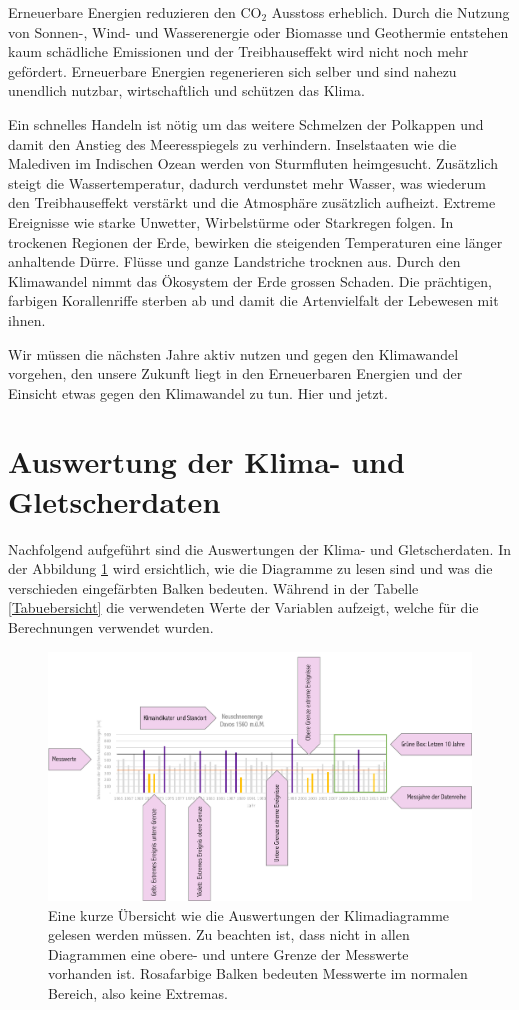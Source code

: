 \begin{refsection}
Erneuerbare Energien reduzieren den CO$_2$ Ausstoss erheblich. Durch die Nutzung von Sonnen-, Wind- und Wasserenergie oder Biomasse und Geothermie entstehen kaum schädliche Emissionen und der Treibhauseffekt wird nicht noch mehr gefördert. Erneuerbare Energien regenerieren sich selber und sind nahezu unendlich nutzbar, wirtschaftlich und schützen das Klima.

Ein schnelles Handeln ist nötig um das weitere Schmelzen der Polkappen und damit den Anstieg des Meeresspiegels zu verhindern. Inselstaaten wie die Malediven im Indischen Ozean werden von Sturmfluten heimgesucht. Zusätzlich steigt die Wassertemperatur, dadurch verdunstet mehr Wasser, was wiederum den Treibhauseffekt verstärkt und die Atmosphäre zusätzlich aufheizt. Extreme Ereignisse wie starke Unwetter, Wirbelstürme oder Starkregen folgen. In trockenen Regionen der Erde, bewirken die steigenden Temperaturen eine länger anhaltende Dürre. Flüsse und ganze Landstriche trocknen aus.
Durch den Klimawandel nimmt das Ökosystem der Erde grossen Schaden. Die prächtigen, farbigen Korallenriffe sterben ab und damit die Artenvielfalt der Lebewesen mit ihnen.


Wir müssen die nächsten Jahre aktiv nutzen und gegen den Klimawandel vorgehen, den unsere Zukunft liegt in den Erneuerbaren Energien und der Einsicht etwas gegen den Klimawandel zu tun. Hier und jetzt.

\section{Auswertung der Klima- und Gletscherdaten} \label{AuswertungKG}
Nachfolgend aufgeführt sind die Auswertungen der Klima- und Gletscherdaten. In der Abbildung \ref{KlimaDia} wird ersichtlich, wie die Diagramme zu lesen sind und was die verschieden eingefärbten Balken bedeuten. Während in der Tabelle \ref{Tabuebersicht} die verwendeten Werte der Variablen aufzeigt, welche für die Berechnungen verwendet wurden.

\begin{figure}
\centering
\includegraphics[width=1.0\textwidth]{extrem/Klimadiagrammlesen.pdf}
\caption{Eine kurze Übersicht wie die Auswertungen der Klimadiagramme gelesen werden müssen. Zu beachten ist, dass nicht in allen Diagrammen eine obere- und untere Grenze der Messwerte vorhanden ist. Rosafarbige Balken bedeuten Messwerte im normalen Bereich, also keine Extremas.}
\label{KlimaDia}
\end{figure}


\end{refsection}
